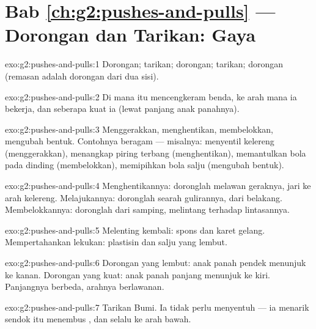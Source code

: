 \section*{Bab \ref{ch:g2:pushes-and-pulls} --- Dorongan dan Tarikan: Gaya}

\begin{solution}{exo:g2:pushes-and-pulls:1}
Dorongan; tarikan; dorongan; tarikan; dorongan (remasan adalah dorongan dari dua sisi).
\end{solution}

\begin{solution}{exo:g2:pushes-and-pulls:2}
Di mana  itu mencengkeram benda, ke arah mana ia bekerja, dan
seberapa kuat ia (lewat panjang anak panahnya).
\end{solution}

\begin{solution}{exo:g2:pushes-and-pulls:3}
Menggerakkan, menghentikan, membelokkan, mengubah bentuk. Contohnya
beragam --- misalnya: menyentil kelereng (menggerakkan), menangkap
piring terbang (menghentikan), memantulkan bola pada dinding
(membelokkan), memipihkan bola salju (mengubah bentuk).
\end{solution}

\begin{solution}{exo:g2:pushes-and-pulls:4}
Menghentikannya: doronglah melawan geraknya, jari ke arah kelereng.
Melajukannya: doronglah searah gulirannya, dari belakang.
Membelokkannya: doronglah dari samping, melintang terhadap
lintasannya.
\end{solution}

\begin{solution}{exo:g2:pushes-and-pulls:5}
Melenting kembali: spons dan karet gelang. Mempertahankan lekukan:
plastisin dan salju yang lembut.
\end{solution}

\begin{solution}{exo:g2:pushes-and-pulls:6}
Dorongan yang lembut: anak panah pendek menunjuk ke kanan. Dorongan
yang kuat: anak panah panjang menunjuk ke kiri. Panjangnya berbeda,
arahnya berlawanan.
\end{solution}

\begin{solution}{exo:g2:pushes-and-pulls:7}
Tarikan Bumi. Ia tidak perlu menyentuh --- ia menarik sendok itu
menembus , dan selalu ke arah bawah.
\end{solution}

